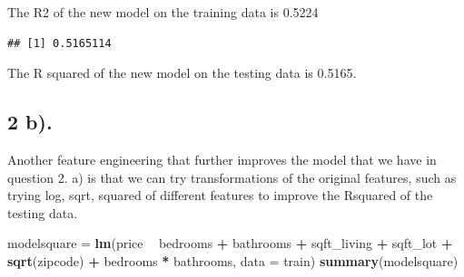 \documentclass[
]{article}
\newenvironment{Shaded}{\begin{snugshade}}{\end{snugshade}}
\newcommand{\DataTypeTok}[1]{\textcolor[rgb]{0.13,0.29,0.53}{#1}}
\newcommand{\DecValTok}[1]{\textcolor[rgb]{0.00,0.00,0.81}{#1}}
\newcommand{\KeywordTok}[1]{\textcolor[rgb]{0.13,0.29,0.53}{\textbf{#1}}}
\newcommand{\NormalTok}[1]{#1}
\newcommand{\OperatorTok}[1]{\textcolor[rgb]{0.81,0.36,0.00}{\textbf{#1}}}
\newcommand{\StringTok}[1]{\textcolor[rgb]{0.31,0.60,0.02}{#1}}
\begin{document}
The R2 of the new model on the training data is 0.5224

\begin{Shaded}
\end{Shaded}

\begin{verbatim}
## [1] 0.5165114
\end{verbatim}

The R squared of the new model on the testing data is 0.5165.

\hypertarget{b.}{%
\subsection{2 b).}\label{b.}}

Another feature engineering that further improves the model that we have
in question 2. a) is that we can try transformations of the original
features, such as trying log, sqrt, squared of different features to
improve the Rsquared of the testing data.

\begin{Shaded}
\begin{Highlighting}[]
\NormalTok{modelsquare =}\StringTok{ }\KeywordTok{lm}\NormalTok{(price }\OperatorTok{~}\StringTok{ }\NormalTok{bedrooms }\OperatorTok{+}\StringTok{ }\NormalTok{bathrooms }\OperatorTok{+}\StringTok{ }\NormalTok{sqft_living }\OperatorTok{+}\StringTok{ }\NormalTok{sqft_lot }\OperatorTok{+}\StringTok{ }\KeywordTok{sqrt}\NormalTok{(zipcode) }\OperatorTok{+}\StringTok{ }\NormalTok{bedrooms }\OperatorTok{*}\StringTok{ }\NormalTok{bathrooms, }\DataTypeTok{data =}\NormalTok{ train)}
\KeywordTok{summary}\NormalTok{(modelsquare)}
\end{Highlighting}
\end{Shaded}
\end{document}
